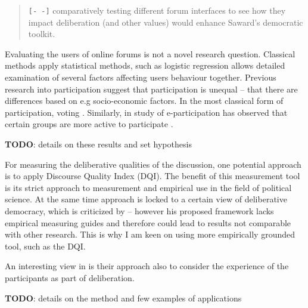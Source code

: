 \documentclass[journal,a4paper]{IEEEtran}
\begin{document}
\begin{quote}
\texttt{[- -]} comparatively testing different forum interfaces to see how they impact deliberation (and other values) would 
enhance Saward’s democratic toolkit.
\end{quote}

Evaluating the users of online forums is not a novel research question. Classical methods apply statistical methods, such as logistic regression allows detailed examination of several factors affecting users behaviour together. Previous research into participation suggest that participation is unequal -- that there are differences based on e.g socio-economic factors. In the most classical form of participation, voting . Similarly, in study of e-participation has observed that certain groups are more active to participate \cite{baek11,albrecht06,strandberg08}.

\textbf{TODO}: details on these results and set hypothesis

For measuring the deliberative qualities of the discussion, one potential approach is to apply  Discourse Quality Index (DQI). The benefit of this measurement tool is its strict approach to measurement and empirical use in the field of political science. At the same time  approach is locked to a certain view of deliberative democracy, which is criticized by  -- however his proposed framework lacks empirical measuring guides and therefore could lead to results not comparable with other research. This is why I am keen on using more empirically grounded tool, such as the DQI.

An interesting view in  is their approach also to consider the experience of the participants as part of deliberation.

\textbf{TODO}: details on the method and few examples of applications



\end{document}
